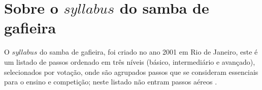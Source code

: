 \section{Sobre o $syllabus$ do samba de gafieira}

O $syllabus$  do samba de gafieira, foi criado no ano 2001 em Rio de Janeiro,
este é um listado de passos ordenado em três níveis (básico, intermediário e avançado),
selecionados por votação,
onde são agrupados passos que se consideram essenciais para o ensino e competição;
neste listado não entram passos aéreos \cite[pp. 144]{perna2002samba}.


